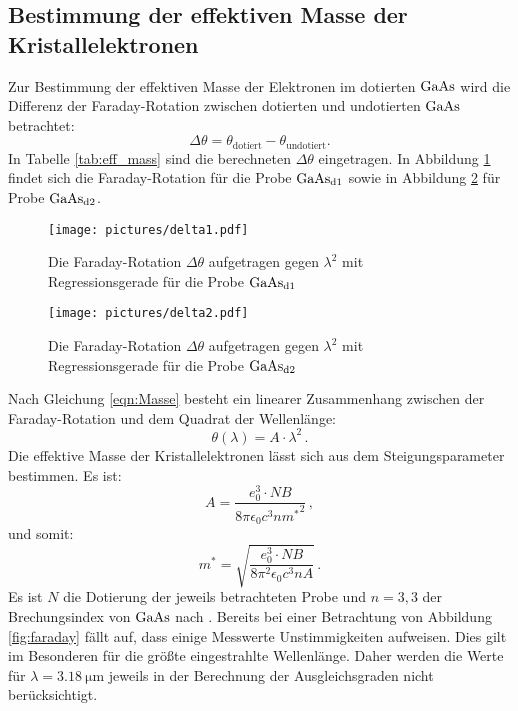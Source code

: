 \subsection{Bestimmung der effektiven Masse der Kristallelektronen}
Zur Bestimmung der effektiven Masse der Elektronen im dotierten $\ce{GaAs}$ wird die Differenz der Faraday-Rotation zwischen dotierten und undotierten $\ce{GaAs}$ betrachtet:
\begin{equation}
\Delta \theta=\theta_{\mathrm{dotiert}}-\theta_{\mathrm{undotiert}}\mathrm{.}
\end{equation}
In Tabelle \ref{tab:eff_mass} sind die berechneten $\Delta\theta$ eingetragen. In Abbildung \ref{fig:delta1} findet sich die Faraday-Rotation für die Probe $\ce{GaAs}_{\mathrm{d1}}$ sowie in Abbildung \ref{fig:delta2}
für Probe $\ce{GaAs}_{\mathrm{d2}}$.

\begin{figure}
  \centering
  \texttt{[image: pictures/delta1.pdf]}
  \caption{Die Faraday-Rotation $\Delta \theta$ aufgetragen gegen $\lambda^{2}$ mit Regressionsgerade für die Probe $\ce{GaAs}_{\mathrm{d1}}$}
  \label{fig:delta1}
\end{figure}
\begin{figure}
  \centering
  \texttt{[image: pictures/delta2.pdf]}
  \caption{Die Faraday-Rotation $\Delta \theta$ aufgetragen gegen $\lambda^{2}$ mit Regressionsgerade für die Probe $\ce{GaAs}_{\mathrm{d2}}$}
  \label{fig:delta2}
\end{figure}
Nach Gleichung \eqref{eqn:Masse} besteht ein linearer Zusammenhang zwischen der Faraday-Rotation und dem Quadrat der Wellenlänge:
\begin{equation}
    \theta(\lambda)=A\cdot\lambda^2 \, \mathrm{.}
\end{equation}
Die effektive Masse der Kristallelektronen lässt sich aus dem Steigungsparameter bestimmen.
Es ist:
\begin{equation}
  A=\frac{e_{\mathrm{0}}^3 \cdot NB}{8\pi \epsilon_{\mathrm{0}} c^3 n {m^{*}}^2} \, \mathrm{,}
\end{equation}
und somit:
\begin{equation}
  {m^{*}}=\sqrt{\frac{e_{\mathrm{0}}^3 \cdot NB}{8\pi^2 \epsilon_{\mathrm{0}} c^3 n A}} \, \mathrm{.}
\end{equation}
Es ist $N$ die Dotierung der jeweils betrachteten Probe und $n=3,3$ der Brechungsindex von $\ce{GaAs}$ nach \cite{ioffe}.
Bereits bei einer Betrachtung von Abbildung \ref{fig:faraday} fällt auf, dass einige Messwerte Unstimmigkeiten aufweisen. Dies gilt im Besonderen für die größte eingestrahlte Wellenlänge. Daher werden die Werte für $\lambda=\SI{3.18}{\micro\meter}$ jeweils in der Berechnung der Ausgleichsgraden nicht berücksichtigt.
